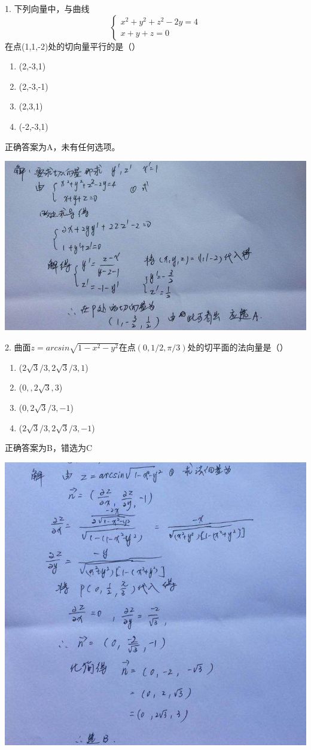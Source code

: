 \documentclass[fleqn]{article}
\begin{document}
\begin{flushleft}
1. 下列向量中，与曲线
		\[
			\left \{
				\begin{array}{ll}
					x^2+y^2+z^2-2y=4 \\ 
					x+y+z=0
				\end{array}
			\right. 
		\]
	在点(1,1,-2)处的切向量平行的是（）
\begin{enumerate}
	\item (2,-3,1)
	\item (2,-3,-1)
	\item (2,3,1)
	\item (-2,-3,1)
\end{enumerate}
正确答案为A，未有任何选项。

\includegraphics[scale=0.5]{8.jpg}

2. 曲面$z=arcsin\sqrt{1-x^2-y^2}$在点$(0,1/2,\pi/3)$处的切平面的法向量是（）
\begin{enumerate}
	\item ($2\sqrt{3}/3,2\sqrt{3}/3,1$)
	\item ($0,,2\sqrt{3},3$)
	\item ($0,2\sqrt{3}/3,-1$)
	\item ($2\sqrt{3}/3,2\sqrt{3}/3,-1$)
\end{enumerate}
正确答案为B，错选为C 

\includegraphics[scale=0.5]{9.jpg}


\end{flushleft}
\end{document}
